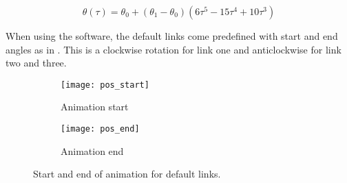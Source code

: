 \begin{equation}\label{quintic}
\theta\left ( \tau \right ) = \theta_0 + \left ( \theta_1 - \theta_0\right )\left ( 6 \tau^5-15\tau^4 + 10\tau^3\right )
\end{equation}

When using the software, the \textsf{default links} come predefined with start and end angles as in . This is a clockwise rotation for link one and anticlockwise for link two and three.

\begin{figure}[ht!]
\begin{subfigure}[b]{0.32\textwidth}
    \centering
    \texttt{[image: pos\_start]}
    \caption{Animation start}
\end{subfigure}
\hfill
\begin{subfigure}[b]{0.4\textwidth}
    \centering
    \texttt{[image: pos\_end]}
    \caption{Animation end}
\end{subfigure}
\caption{Start and end of animation for default links.}
\label{animation}
\end{figure}